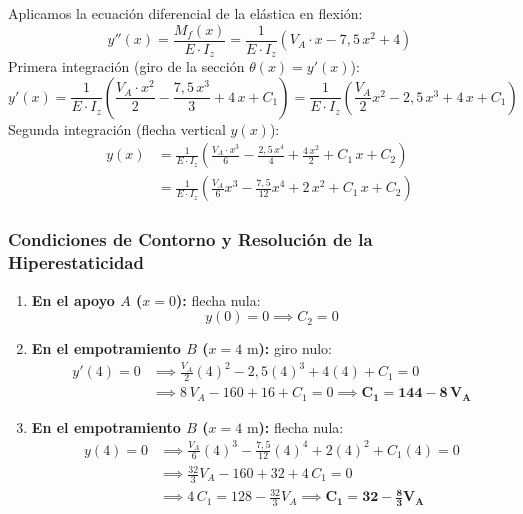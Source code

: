 Aplicamos la ecuación diferencial de la elástica en flexión:
\begin{equation}
    y''(x) = \frac{M_f(x)}{E \cdot I_z} = \frac{1}{E \cdot I_z} \left( V_A \cdot x - 7{,}5\,x^2 + 4 \right)
\end{equation}
Primera integración (giro de la sección $\theta(x) = y'(x)$):
\begin{equation}
    y'(x) = \frac{1}{E \cdot I_z} \left( \frac{V_A \cdot x^2}{2} - \frac{7{,}5\,x^3}{3} + 4\,x + C_1 \right) = \frac{1}{E \cdot I_z} \left( \frac{V_A}{2}x^2 - 2{,}5\,x^3 + 4\,x + C_1 \right)
\end{equation}
Segunda integración (flecha vertical $y(x)$):
\begin{align}
    y(x) & = \frac{1}{E \cdot I_z} \left( \frac{V_A \cdot x^3}{6} - \frac{2{,}5\,x^4}{4} + \frac{4\,x^2}{2} + C_1\,x + C_2 \right) \nonumber \\
         & = \frac{1}{E \cdot I_z} \left( \frac{V_A}{6}x^3 - \frac{7{,}5}{12}x^4 + 2\,x^2 + C_1\,x + C_2 \right)
\end{align}

\subsubsection*{Condiciones de Contorno y Resolución de la Hiperestaticidad}
\begin{enumerate}
    \item \textbf{En el apoyo $A$ ($x = 0$):} flecha nula:
          \begin{equation}
              y(0) = 0 \implies C_2 = 0
          \end{equation}
    \item \textbf{En el empotramiento $B$ ($x = 4\text{ m}$):} giro nulo:
          \begin{align}
              y'(4) = 0 & \implies \frac{V_A}{2}(4)^2 - 2{,}5(4)^3 + 4(4) + C_1 = 0 \nonumber \\
                        & \implies 8\,V_A - 160 + 16 + C_1 = 0 \implies \mathbf{C_1 = 144 - 8\,V_A}
          \end{align}
    \item \textbf{En el empotramiento $B$ ($x = 4\text{ m}$):} flecha nula:
          \begin{align}
              y(4) = 0 & \implies \frac{V_A}{6}(4)^3 - \frac{7{,}5}{12}(4)^4 + 2(4)^2 + C_1(4) = 0 \nonumber \\
                       & \implies \frac{32}{3}V_A - 160 + 32 + 4\,C_1 = 0 \nonumber \\
                       & \implies 4\,C_1 = 128 - \frac{32}{3}V_A \implies \mathbf{C_1 = 32 - \frac{8}{3}V_A}
          \end{align}
\end{enumerate}

